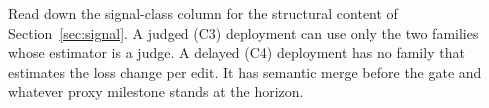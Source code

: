Read down the signal-class column for the structural content of Section~\ref{sec:signal}. A judged (C3) deployment can use only the two families whose estimator is a judge. A delayed (C4) deployment has no family that estimates the loss change per edit. It has semantic merge before the gate and whatever proxy milestone stands at the horizon.
